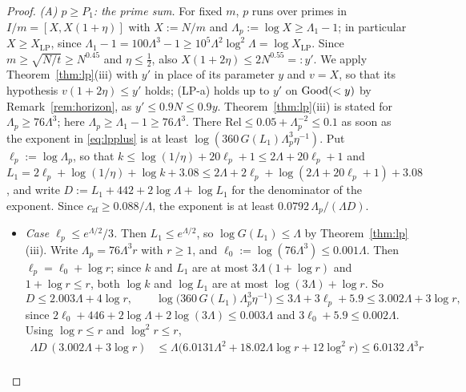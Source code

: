 \begin{proof}
\emph{(A) $p\ge P_1$: the prime sum.} For fixed $m$, $p$ runs over primes in $I/m=[X,X(1+\eta)]$ with $X:=N/m$ and
$\Lambda_p:=\log X\ge\Lambda_1-1$; in particular $X\ge X_{\mathrm{LP}}$, since $\Lambda_1-1=100\Lambda^3-1\ge10^5\Lambda^2\log^2\Lambda=\log X_{\mathrm{LP}}$.
Since $m\ge\sqrt{N/t}\ge N^{0.45}$ and $\eta\le\frac12$, also $X(1+2\eta)\le2N^{0.55}=:y'$. We apply Theorem~\ref{thm:lp}(iii)
with $y'$ in place of its parameter $y$ and $v=X$, so that its hypothesis $v(1+2\eta)\le y'$ holds; (LP-a) holds up to $y'$ on
$\mathrm{Good}(<y)$ by Remark~\ref{rem:horizon}, as $y'\le0.9N\le0.9y$. Theorem~\ref{thm:lp}(iii) is stated for $\Lambda_p\ge76\Lambda^3$; here
$\Lambda_p\ge\Lambda_1-1\ge76\Lambda^3$. There $\mathrm{Rel}\le0.05+\Lambda_p^{-2}\le0.1$ as soon as the exponent in
\eqref{eq:lpplus} is at least $\log(360\,G(L_1)\Lambda_p^3\eta^{-1})$. Put $\ell_p:=\log\Lambda_p$, so that
$k\le\log(1/\eta)+20\ell_p+1\le2\Lambda+20\ell_p+1$ and
$L_1=2\ell_p+\log(1/\eta)+\log k+3.08\le2\Lambda+2\ell_p+\log(2\Lambda+20\ell_p+1)+3.08$, and write
$D:=L_1+442+2\log\Lambda+\log L_1$ for the denominator of the exponent. Since $c_{\mathrm{zf}}\ge0.088/\Lambda$, the exponent
is at least $0.0792\,\Lambda_p/(\Lambda D)$.
\begin{itemize}
\item \emph{Case $\ell_p\le e^{\Lambda/2}/3$.} Then $L_1\le e^{\Lambda/2}$, so $\log G(L_1)\le\Lambda$ by Theorem~\ref{thm:lp}(iii).
  Write $\Lambda_p=76\Lambda^3r$ with $r\ge1$, and $\ell_0:=\log(76\Lambda^3)\le0.001\Lambda$. Then $\ell_p=\ell_0+\log r$; since
  $k$ and $L_1$ are at most $3\Lambda(1+\log r)$ and $1+\log r\le r$, both $\log k$ and $\log L_1$ are at most
  $\log(3\Lambda)+\log r$. So
  \[
    D\le2.003\Lambda+4\log r,\qquad \log\bigl(360\,G(L_1)\Lambda_p^3\eta^{-1}\bigr)\le3\Lambda+3\ell_p+5.9\le3.002\Lambda+3\log r,
  \]
  since $2\ell_0+446+2\log\Lambda+2\log(3\Lambda)\le0.003\Lambda$ and $3\ell_0+5.9\le0.002\Lambda$. Using $\log r\le r$ and
  $\log^2r\le r$,
  \[
  \begin{aligned}
    \Lambda D\,(3.002\Lambda+3\log r)&\le\Lambda\bigl(6.0131\Lambda^2+18.02\Lambda\log r+12\log^2r\bigr)\le6.0132\,\Lambda^3r\\

\end{aligned}\]
\end{itemize}
\end{proof}
